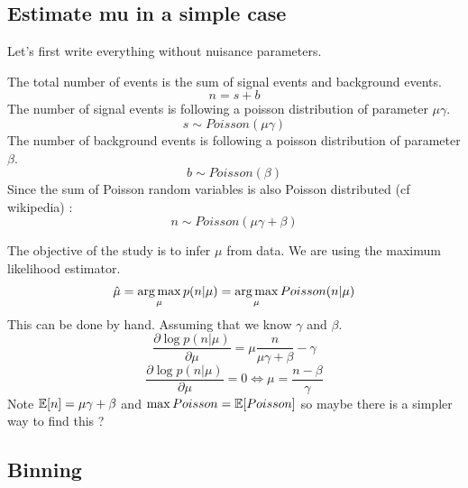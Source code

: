 \subsection{Estimate mu in a simple case} %
\label{sub:estimate_mu_in_a_simple_case}

Let's first write everything without nuisance parameters.

The total number of events is the sum of signal events and background events.
\begin{equation}
	n = s + b
\end{equation}
The number of signal events is following a poisson distribution of parameter $\mu \gamma$.
\begin{equation}
	s \sim Poisson(\mu \gamma)
\end{equation}
The number of background events is following a poisson distribution of parameter $\beta$.
\begin{equation}
	b \sim Poisson(\beta)
\end{equation}
Since the sum of Poisson random variables is also Poisson distributed \needcite (cf wikipedia) :
\begin{equation}
	n \sim Poisson(\mu \gamma + \beta)
\end{equation}

The objective of the study is to infer $\mu$ from data.
We are using the maximum likelihood estimator.
\begin{equation}
    \hat \mu = \operatorname*{arg\,max}_\mu p(n|\mu) =  \operatorname*{arg\,max}_\mu Poisson(n|\mu)
\end{equation}
This can be done by hand. Assuming that we know $\gamma$ and  $\beta$.
\begin{equation}
    \frac{\partial \log p(n|\mu)}{\partial \mu} =  \mu \frac{n}{\mu\gamma + \beta} - \gamma
\end{equation}
\begin{equation}
    \frac{\partial \log p(n|\mu)}{\partial \mu} = 0 \iff \mu = \frac{n-\beta}{\gamma}
\end{equation}
Note $\mathbb{E}[n] = \mu\gamma + \beta$ and $\max Poisson = \mathbb{E}[Poisson]$ so maybe there is a simpler way to find this ?




\subsection{Binning} %
\label{sub:binning}

